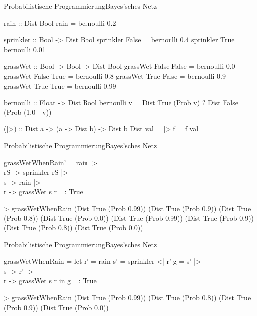 \documentclass{beamer}
\begin{document}
\begin{frame}[fragile]{Probabilistische Programmierung}{Bayes'sches Netz}
\footnotesize
\begin{semiverbatim}
rain :: Dist Bool
rain = bernoulli 0.2

sprinkler :: Bool -> Dist Bool
sprinkler False = bernoulli 0.4
sprinkler True  = bernoulli 0.01

grassWet :: Bool -> Bool -> Dist Bool
grassWet False False = bernoulli 0.0
grassWet False True  = bernoulli 0.8
grassWet True  False = bernoulli 0.9
grassWet True  True  = bernoulli 0.99

bernoulli :: Float -> Dist Bool
bernoulli v = Dist True  (Prob v)
            ? Dist False (Prob (1.0 - v))

(|>) :: Dist a -> (a -> Dist b) -> Dist b
Dist val _ |> f = f val
\end{semiverbatim}
\end{frame}

\begin{frame}[fragile]{Probabilistische Programmierung}{Bayes'sches Netz}
\small
\begin{semiverbatim}
grassWetWhenRain' = rain |> \\rS ->
                    sprinkler rS |> \\s ->
                    rain |> \\r ->
                      grassWet s r =: True
\end{semiverbatim}
\vfill
\begin{semiverbatim}
> grassWetWhenRain
(Dist True (Prob 0.99))
(Dist True (Prob 0.9))
(Dist True (Prob 0.8))
(Dist True (Prob 0.0))
(Dist True (Prob 0.99))
(Dist True (Prob 0.9))
(Dist True (Prob 0.8))
(Dist True (Prob 0.0))
\end{semiverbatim}
\vfill
\end{frame}

\begin{frame}[fragile]{Probabilistische Programmierung}{Bayes'sches Netz}
\small
\begin{semiverbatim}
grassWetWhenRain =
  let r' = rain
      s' = sprinkler <| r'
      g = s' |> \\s ->
          r' |> \\r ->
            grassWet s r
  in g =: True
\end{semiverbatim}
\vfill
\begin{semiverbatim}
> grassWetWhenRain
(Dist True (Prob 0.99))
(Dist True (Prob 0.8))
(Dist True (Prob 0.9))
(Dist True (Prob 0.0))
\end{semiverbatim}
\vfill
\end{frame}
\end{document}
